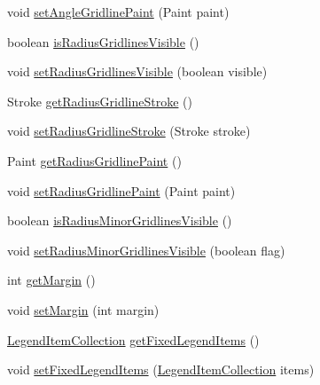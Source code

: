 \begin{DoxyCompactItemize}
\item 
void \mbox{\hyperlink{classorg_1_1jfree_1_1chart_1_1plot_1_1_polar_plot_aa1b26ecd352af4353c51534276d45f1a}{set\+Angle\+Gridline\+Paint}} (Paint paint)
\item 
boolean \mbox{\hyperlink{classorg_1_1jfree_1_1chart_1_1plot_1_1_polar_plot_a671ccfb1c60f6f84f03268404cc12029}{is\+Radius\+Gridlines\+Visible}} ()
\item 
void \mbox{\hyperlink{classorg_1_1jfree_1_1chart_1_1plot_1_1_polar_plot_ad0accbd7efb89fbc9cd9db8a5e344e8d}{set\+Radius\+Gridlines\+Visible}} (boolean visible)
\item 
Stroke \mbox{\hyperlink{classorg_1_1jfree_1_1chart_1_1plot_1_1_polar_plot_a1b4ef859b3d90ec47c795f53c66eddb0}{get\+Radius\+Gridline\+Stroke}} ()
\item 
void \mbox{\hyperlink{classorg_1_1jfree_1_1chart_1_1plot_1_1_polar_plot_a925128302a5680329e7629b689568d6c}{set\+Radius\+Gridline\+Stroke}} (Stroke stroke)
\item 
Paint \mbox{\hyperlink{classorg_1_1jfree_1_1chart_1_1plot_1_1_polar_plot_a4589a05cc95f039c6c054f6657f3f659}{get\+Radius\+Gridline\+Paint}} ()
\item 
void \mbox{\hyperlink{classorg_1_1jfree_1_1chart_1_1plot_1_1_polar_plot_a975386d543478708d2273a841aa96455}{set\+Radius\+Gridline\+Paint}} (Paint paint)
\item 
boolean \mbox{\hyperlink{classorg_1_1jfree_1_1chart_1_1plot_1_1_polar_plot_a30132532bfe024fa2e0b08fea5bd4f88}{is\+Radius\+Minor\+Gridlines\+Visible}} ()
\item 
void \mbox{\hyperlink{classorg_1_1jfree_1_1chart_1_1plot_1_1_polar_plot_a7db9bf743cb86d1ee47d2b1c4104e5b1}{set\+Radius\+Minor\+Gridlines\+Visible}} (boolean flag)
\item 
int \mbox{\hyperlink{classorg_1_1jfree_1_1chart_1_1plot_1_1_polar_plot_a69731d97ebfbf1317432bfeb5d0bf715}{get\+Margin}} ()
\item 
void \mbox{\hyperlink{classorg_1_1jfree_1_1chart_1_1plot_1_1_polar_plot_aea960472c437f64e67a83331428ba4f6}{set\+Margin}} (int margin)
\item 
\mbox{\hyperlink{classorg_1_1jfree_1_1chart_1_1_legend_item_collection}{Legend\+Item\+Collection}} \mbox{\hyperlink{classorg_1_1jfree_1_1chart_1_1plot_1_1_polar_plot_af0152e32f5a043b5313c82db825d0154}{get\+Fixed\+Legend\+Items}} ()
\item 
void \mbox{\hyperlink{classorg_1_1jfree_1_1chart_1_1plot_1_1_polar_plot_a6ed8b0a9982bf4d0cacd52fa8f1b57d0}{set\+Fixed\+Legend\+Items}} (\mbox{\hyperlink{classorg_1_1jfree_1_1chart_1_1_legend_item_collection}{Legend\+Item\+Collection}} items)

\end{DoxyCompactItemize}
